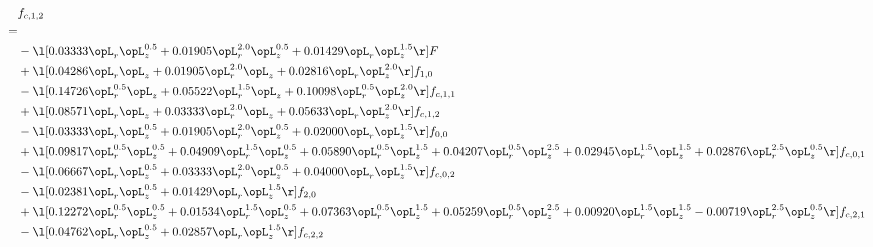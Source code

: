 \begin{alignat}{2} 
\label{eq:f_12_1} 
& f_{c,1,2} \nonumber \\ 
 = \\ 
& - \l[  0.03333 \opL_r \opL_z^{0.5} +  0.01905 \opL_r^{2.0} \opL_z^{0.5} +  0.01429 \opL_r \opL_z^{1.5}  \r] F \nonumber \\ 
& + \l[  0.04286 \opL_r \opL_z +  0.01905 \opL_r^{2.0} \opL_z +  0.02816 \opL_r \opL_z^{2.0}  \r] f_{1,0} \nonumber \\ 
& - \l[  0.14726 \opL_r^{0.5} \opL_z +  0.05522 \opL_r^{1.5} \opL_z +  0.10098 \opL_r^{0.5} \opL_z^{2.0}  \r] f_{c,1,1} \nonumber \\ 
& + \l[  0.08571 \opL_r \opL_z +  0.03333 \opL_r^{2.0} \opL_z +  0.05633 \opL_r \opL_z^{2.0}  \r] f_{c,1,2} \nonumber \\ 
& - \l[  0.03333 \opL_r \opL_z^{0.5} +  0.01905 \opL_r^{2.0} \opL_z^{0.5} +  0.02000 \opL_r \opL_z^{1.5}  \r] f_{0,0} \nonumber \\ 
& + \l[  0.09817 \opL_r^{0.5} \opL_z^{0.5} +  0.04909 \opL_r^{1.5} \opL_z^{0.5} +  0.05890 \opL_r^{0.5} \opL_z^{1.5} +  0.04207 \opL_r^{0.5} \opL_z^{2.5} +  0.02945 \opL_r^{1.5} \opL_z^{1.5} +  0.02876 \opL_r^{2.5} \opL_z^{0.5}  \r] f_{c,0,1} \nonumber \\ 
& - \l[  0.06667 \opL_r \opL_z^{0.5} +  0.03333 \opL_r^{2.0} \opL_z^{0.5} +  0.04000 \opL_r \opL_z^{1.5}  \r] f_{c,0,2} \nonumber \\ 
& - \l[  0.02381 \opL_r \opL_z^{0.5} +  0.01429 \opL_r \opL_z^{1.5}  \r] f_{2,0} \nonumber \\ 
& + \l[  0.12272 \opL_r^{0.5} \opL_z^{0.5} +  0.01534 \opL_r^{1.5} \opL_z^{0.5} +  0.07363 \opL_r^{0.5} \opL_z^{1.5} +  0.05259 \opL_r^{0.5} \opL_z^{2.5} +  0.00920 \opL_r^{1.5} \opL_z^{1.5}   -0.00719 \opL_r^{2.5} \opL_z^{0.5}  \r] f_{c,2,1} \nonumber \\ 
& - \l[  0.04762 \opL_r \opL_z^{0.5} +  0.02857 \opL_r \opL_z^{1.5}  \r] f_{c,2,2} \nonumber \\ 
\end{alignat} 


